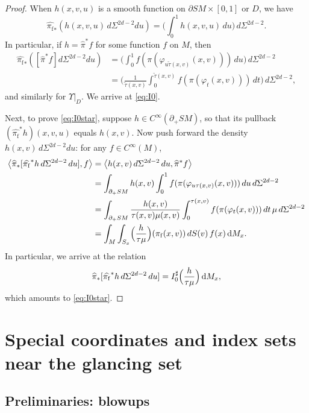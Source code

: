 \documentclass[11pt]{article}
\theoremstyle{plain}
\theoremstyle{definition}
\theoremstyle{remark}
\newcommand{\adj}{I_0^\sharp}
\newcommand{\hpi}{\widehat{\pi}}
\newcommand {\dM}{\mathrm{d}M}
\newcommand{\foot}{{\pi_{\mathrm f}}}
\newcommand{\hF}{\widehat{\foot}}
\begin{document}
\begin{proof}
When $h(x,v,u)$ is a smooth function on $\partial SM \times [0,1]$ or $D$, we have
\begin{equation*}
\hF_* (h(x,v,u)\, d\Sigma^{2d-2} du) = \biggl(\int_0^1 h(x,v,u)\, du \biggr)\,d\Sigma^{2d-2}.
\end{equation*}
In particular, if $h = \hpi^* f$ for some function $f$ on $M$, then
\begin{equation*}%
\begin{aligned}
\hF_* \left([\hpi^* f]d\Sigma^{2d-2} du \right) &= \biggl(\int_0^1 f(\pi(\varphi_{u\tilde \tau(x,v)}(x,v)))\,du\biggr)\,d\Sigma^{2d-2} \\
&= \biggl(\frac{1}{\tilde\tau(x,v)} \int_0^{\tilde \tau(x,v)} f(\pi(\varphi_t(x,v)))\,dt\biggr)\,d\Sigma^{2d-2},
\end{aligned}
\end{equation*}
and similarly for $\Upsilon|_D$. We arrive at \eqref{eq:I0}.

Next, to prove \eqref{eq:I0star}, suppose $h \in C^\infty(\partial_+ SM)$, so that its pullback $(\hF^* h)(x,v,u)$ equals $h(x,v)$.
Now push forward the density $h(x,v)\,d\Sigma^{2d-2} du$: for any $f\in C^\infty(M)$,
\begin{align*}
\left\langle \hpi_* [\hF^* h\,d\Sigma^{2d-2}\,du], f \right\rangle &= \left\langle h(x,v)\,d\Sigma^{2d-2}\,du, \hpi^* f\right\rangle \\
&= \int_{\partial_+ SM} h(x,v) \int_0^1 f(\pi(\varphi_{u\tau(x,v)}(x,v)))\,du\,d\Sigma^{2d-2} \\
&= \int_{\partial_+ SM} \frac{h(x,v)}{\tau(x,v) \mu(x,v)} \int_{0}^{\tau(x,v)} f(\pi(\varphi_t(x,v)))\,dt\,\mu\,d\Sigma^{2d-2} \\
&= \int_M \int_{S_x} \Bigl(\frac{h}{\tau\mu}\Bigr)(\foot(x,v))\,dS(v)\,f(x)\,\dM_x.
\end{align*}
In particular, we arrive at the relation
\begin{equation*}
\hpi_* [\hF^* h\,d\Sigma^{2d-2}\,du] = \adj \Bigl(\frac{h}{\tau\mu} \Bigr)\,\dM_x,
\end{equation*}
which amounts to \eqref{eq:I0star}.
\end{proof}

\section{Special coordinates and index sets near the glancing set}

\subsection{Preliminaries: blowups} \label{sec:blowup}
\end{document}
